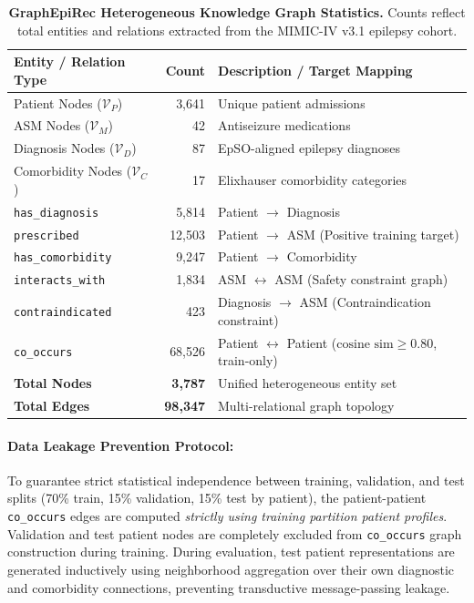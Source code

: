 \documentclass[11pt,a4paper]{article}
\begin{document}
\begin{table}[t]
\centering
\caption{\textbf{GraphEpiRec Heterogeneous Knowledge Graph Statistics.} Counts reflect total entities and relations extracted from the MIMIC-IV v3.1 epilepsy cohort.}
\label{tab:kg_stats}
\small
\begin{tabular}{lrl}
\toprule
\textbf{Entity / Relation Type} & \textbf{Count} & \textbf{Description / Target Mapping} \\
\midrule
Patient Nodes ($\mathcal{V}_P$) & 3,641 & Unique patient admissions \\
ASM Nodes ($\mathcal{V}_M$) & 42 & Antiseizure medications \\
Diagnosis Nodes ($\mathcal{V}_D$) & 87 & EpSO-aligned epilepsy diagnoses \\
Comorbidity Nodes ($\mathcal{V}_C$) & 17 & Elixhauser comorbidity categories \\
\midrule
\texttt{has\_diagnosis} & 5,814 & Patient $\rightarrow$ Diagnosis \\
\texttt{prescribed} & 12,503 & Patient $\rightarrow$ ASM (Positive training target) \\
\texttt{has\_comorbidity} & 9,247 & Patient $\rightarrow$ Comorbidity \\
\texttt{interacts\_with} & 1,834 & ASM $\leftrightarrow$ ASM (Safety constraint graph) \\
\texttt{contraindicated} & 423 & Diagnosis $\rightarrow$ ASM (Contraindication constraint) \\
\texttt{co\_occurs} & 68,526 & Patient $\leftrightarrow$ Patient ($\text{cosine sim} \ge 0.80$, train-only) \\
\midrule
\textbf{Total Nodes} & \textbf{3,787} & Unified heterogeneous entity set \\
\textbf{Total Edges} & \textbf{98,347} & Multi-relational graph topology \\
\bottomrule
\end{tabular}
\end{table}

\paragraph{Data Leakage Prevention Protocol:}
To guarantee strict statistical independence between training, validation, and test splits (70\% train, 15\% validation, 15\% test by patient), the patient-patient \texttt{co\_occurs} edges are computed \emph{strictly using training partition patient profiles}. Validation and test patient nodes are completely excluded from \texttt{co\_occurs} graph construction during training. During evaluation, test patient representations are generated inductively using neighborhood aggregation over their own diagnostic and comorbidity connections, preventing transductive message-passing leakage.
\end{document}
